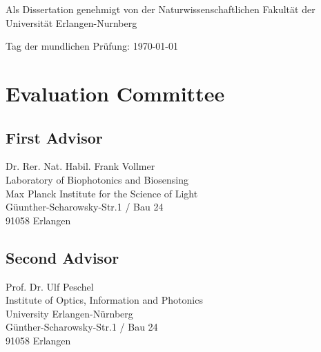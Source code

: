 Als Dissertation genehmigt von der Naturwissenschaftlichen Fakultät der
Universität Erlangen-Nurnberg\\
\vspace{0.5cm}

Tag der mundlichen Prüfung: \today\\
\vspace{0.5cm}

\section*{Evaluation Committee}
\subsection*{First Advisor}
Dr. Rer. Nat. Habil. Frank Vollmer\\
Laboratory of Biophotonics and Biosensing\\
Max Planck Institute for the Science of Light\\
Güunther-Scharowsky-Str.1 / Bau 24\\
91058 Erlangen
\subsection*{Second Advisor}
Prof. Dr. Ulf Peschel\\
Institute of Optics, Information and Photonics\\
University Erlangen-Nürnberg\\
Günther-Scharowsky-Str.1 / Bau 24\\
91058 Erlangen


